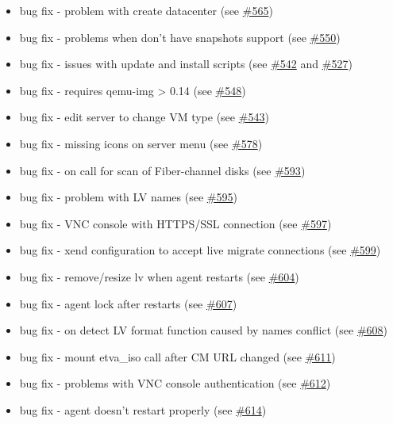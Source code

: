 \begin{itemize}
\item bug fix - problem with create datacenter (see \href{https://srcmaster.eurotux.com/pm/p/etva/ticket/565}{\#565})
\item bug fix - problems when don't have snapshots support (see \href{https://srcmaster.eurotux.com/pm/p/etva/ticket/550}{\#550})
\item bug fix - issues with update and install scripts (see \href{https://srcmaster.eurotux.com/pm/p/etva/ticket/542}{\#542} and \href{https://srcmaster.eurotux.com/pm/p/etva/ticket/527}{\#527})
\item bug fix - requires qemu-img > 0.14 (see \href{https://srcmaster.eurotux.com/pm/p/etva/ticket/548}{\#548})
\item bug fix - edit server to change VM type (see \href{https://srcmaster.eurotux.com/pm/p/etva/ticket/543}{\#543})
\item bug fix - missing icons on server menu (see \href{https://srcmaster.eurotux.com/pm/p/etva/ticket/578}{\#578})
\item bug fix - on call for scan of Fiber-channel disks (see \href{https://srcmaster.eurotux.com/pm/p/etva/ticket/593}{\#593})
\item bug fix - problem with LV names (see \href{https://srcmaster.eurotux.com/pm/p/etva/ticket/595}{\#595})
\item bug fix - VNC console with HTTPS/SSL connection (see \href{https://srcmaster.eurotux.com/pm/p/etva/ticket/597}{\#597})
\item bug fix - xend configuration to accept live migrate connections (see \href{https://srcmaster.eurotux.com/pm/p/etva/ticket/599}{\#599})
\item bug fix - remove/resize lv when agent restarts (see \href{https://srcmaster.eurotux.com/pm/p/etva/ticket/604}{\#604})
\item bug fix - agent lock after restarts (see \href{https://srcmaster.eurotux.com/pm/p/etva/ticket/607}{\#607})
\item bug fix - on detect LV format function caused by names conflict (see \href{https://srcmaster.eurotux.com/pm/p/etva/ticket/608}{\#608})
\item bug fix - mount etva\_iso call after CM URL changed (see \href{https://srcmaster.eurotux.com/pm/p/etva/ticket/611}{\#611})
\item bug fix - problems with VNC console authentication (see \href{https://srcmaster.eurotux.com/pm/p/etva/ticket/612}{\#612})
\item bug fix - agent doesn't restart properly (see \href{https://srcmaster.eurotux.com/pm/p/etva/ticket/614}{\#614})
\end{itemize}

